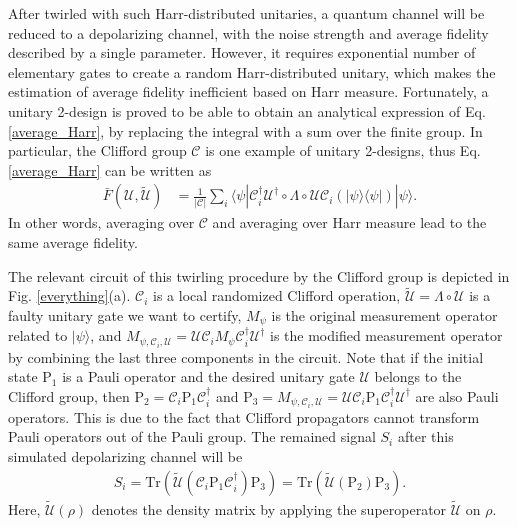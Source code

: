 \documentclass[prl,twocolumn,showpacs]{revtex4-1}
\newcommand{\bra}[1]{\langle #1|}
\newcommand{\ket}[1]{|#1\rangle}
\begin{document}
After twirled with such Harr-distributed unitaries, a quantum channel will be reduced to a depolarizing channel, with the noise strength and average fidelity described by a single parameter\cite{Emerson2007}. However, it requires exponential number of  elementary gates to create a random Harr-distributed unitary, which makes the estimation of average fidelity inefficient based on Harr measure. Fortunately, a unitary 2-design\cite{Dankert2009} is proved to be able to obtain an analytical expression of Eq. \ref{average_Harr}, by replacing the integral with a sum over the finite group. In particular, the Clifford group $\mathcal{C}$ is one example of unitary 2-designs, thus Eq. \ref{average_Harr} can be written as
\begin{align} \label{average_Clifford}
\bar{F}(\mathcal{U}, \tilde{\mathcal{U}}) &= \frac{1}{|\mathcal{C}|}\sum_i \bra{\psi} \mathcal{C}_i^{\dagger} \mathcal{U}^{\dagger}\circ \Lambda \circ \mathcal{U} \mathcal{C}_i(\ket{\psi} \bra{\psi}) \ket{\psi}.
\end{align}
In other words, averaging over $\mathcal{C}$ and averaging over Harr measure lead to the same average fidelity.

The relevant circuit of this twirling procedure by the Clifford group is depicted in Fig. \ref{everything}(a). $\mathcal{C}_i$ is a local randomized Clifford operation, $\tilde{\mathcal{U}} = \Lambda \circ \mathcal{U}$ is a faulty unitary gate we want to certify, $M_\psi$ is the original measurement operator related to $\ket{\psi}$, and $M_{\psi, \mathcal{C}_i, \mathcal{U}} = \mathcal{U}\mathcal{C}_i M_\psi \mathcal{C}_i^{\dagger}\mathcal{U}^{\dagger}$ is the modified measurement operator by combining the last three components in the circuit. Note that if the initial state P$_1$ is a Pauli operator and the desired unitary gate $\mathcal{U}$ belongs to the Clifford group, then $\text{P}_2 = \mathcal{C}_i \text{P}_1 \mathcal{C}_i^{\dagger}$ and $\text{P}_3 = M_{\psi, \mathcal{C}_i, \mathcal{U}}= \mathcal{U}\mathcal{C}_i \text{P}_1 \mathcal{C}_i^{\dagger}\mathcal{U}^{\dagger}$ are also Pauli operators. This is due to the fact that Clifford propagators cannot transform Pauli operators out of the Pauli group. The remained signal $S_i$ after this simulated depolarizing channel will be
\begin{align} \label{remain_signal}
S_i = \text{Tr} \left( \tilde{\mathcal{U}} \left(\mathcal{C}_i\text{P}_1\mathcal{C}_i^{\dagger} \right) \text{P}_3\right) = \text{Tr} \left( \tilde{\mathcal{U}} \left( \text{P}_2\right) \text{P}_3\right).
\end{align}
Here, $\tilde{\mathcal{U}}(\rho)$ denotes the density matrix by applying the superoperator $\tilde{\mathcal{U}}$ on $\rho$.
\end{document}
